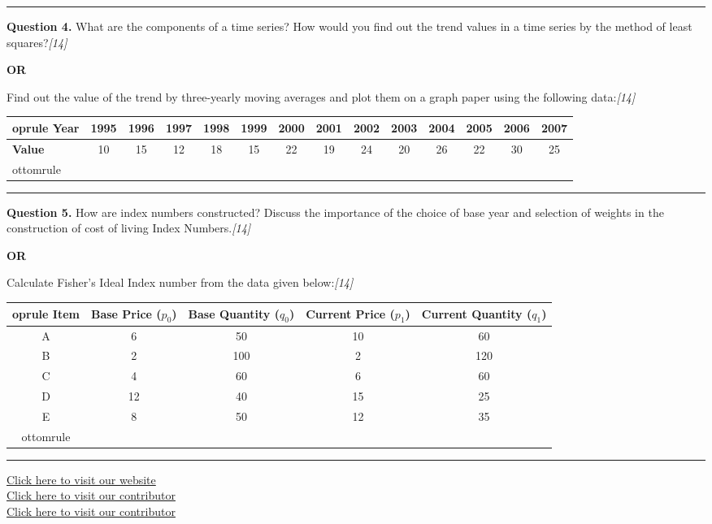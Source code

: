 \documentclass[11pt,a4paper]{article}
\newcommand{\pts}[1]{\hfill   \textit{[#1]}}
\begin{document}
\medskip\rule{\linewidth}{0.2pt}




\noindent   \textbf{Question 4.}
What are the components of a time series? How would you find out the trend values in a time series by the method of least squares?\pts{14}

\centerline{   \textbf{OR}}

Find out the value of the trend by three-yearly moving averages and plot them on a graph paper using the following data:\pts{14}

\begin{center}
  \small
  
\begin{tabular}{lccccccccccccc}
     oprule
   \textbf{Year}  & 1995 & 1996 & 1997 & 1998 & 1999 & 2000 & 2001 & 2002 & 2003 & 2004 & 2005 & 2006 & 2007 \\
    \midrule
   \textbf{Value} & 10   & 15   & 12   & 18   & 15   & 22   & 19   & 24   & 20   & 26   & 22   & 30   & 25   \\
    ottomrule
  \end{tabular}
\end{center}

\medskip\rule{\linewidth}{0.2pt}




\noindent   \textbf{Question 5.}
How are index numbers constructed? Discuss the importance of the choice of base year and selection of weights in the construction of cost of living Index Numbers.\pts{14}

\centerline{   \textbf{OR}}

Calculate Fisher's Ideal Index number from the data given below:\pts{14}

\begin{center}
  \small
  
\begin{tabular}{ccccc}
     oprule
   \textbf{Item} &   \textbf{Base Price} ($p_0$) &   \textbf{Base Quantity} ($q_0$) &   \textbf{Current Price} ($p_1$) &   \textbf{Current Quantity} ($q_1$) \\
    \midrule
    A & 6  & 50  & 10 & 60  \\
    B & 2  & 100 & 2  & 120 \\
    C & 4  & 60  & 6  & 60  \\
    D & 12 & 40  & 15 & 25  \\
    E & 8  & 50  & 12 & 35  \\
    ottomrule
  \end{tabular}
\end{center}

\vfill
\rule{\linewidth}{0.4pt}

\begin{center}\small
\href{https://bhu-exam.vercel.app/}{Click here to visit our website}\\[4pt]
\href{https://me-aryan.vercel.app/}{Click here to visit our contributor}\\[4pt]
\href{https://quashan-me.vercel.app/}{Click here to visit our contributor}
\end{center}
\end{document}
